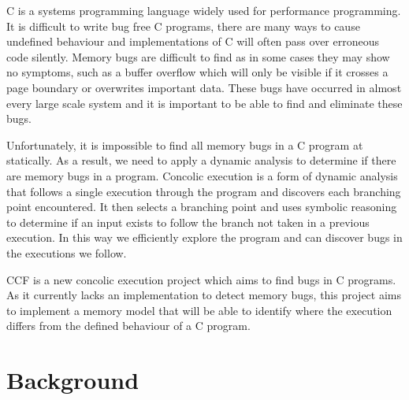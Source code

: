 \documentclass[12pt,twoside]{report}
\begin{document}
C is a systems programming language widely used for performance programming. It is difficult to write bug free C programs, there are many ways to cause undefined behaviour and implementations of C will often pass over erroneous code silently. Memory bugs are difficult to find as in some cases they may show no symptoms, such as a buffer overflow which will only be visible if it crosses a page boundary or overwrites important data. These bugs have occurred in almost every large scale system and it is important to be able to find and eliminate these bugs.

Unfortunately, it is impossible to find all memory bugs in a C program at statically. As a result, we need to apply a dynamic analysis to determine if there are memory bugs in a program. Concolic execution is a form of dynamic analysis that follows a single execution through the program and discovers each branching point encountered. It then selects a branching point and uses symbolic reasoning to determine if an input exists to follow the branch not taken in a previous execution. In this way we efficiently explore the program and can discover bugs in the executions we follow.

CCF is a new concolic execution project which aims to find bugs in C programs. As it currently lacks an implementation to detect memory bugs, this project aims to implement a memory model that will be able to identify where the execution differs from the defined behaviour of a C program. 



\chapter{Background}
\end{document}
